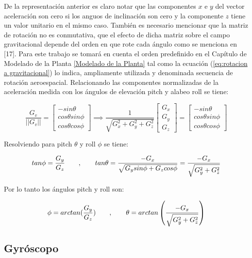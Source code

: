 \documentclass[../main.tex]{subfiles}
\begin{document}
De la representación anterior es claro notar que las componentes $x$
e $y$ del vector aceleración son cero si los anguos de inclinación
son cero y la componente $z$ tiene un valor unitario en el mismo
caso. También es necesario mencionar que la matriz de rotación no
es conmutativa, que el efecto de dicha matriz sobre el campo gravitacional
depende del orden en que rote cada ángulo como se menciona en [17].
Para este trabajo se tomará en cuenta el orden predefinido en el
Capítulo de Modelado de la Planta \ref{Modelado de la Planta} tal como la ecuación (\ref{eq:rotacion a gravitacional})
lo indica, ampliamente utilizada y denominada secuencia de rotación
aeroespacial. Relacionando las componentes normalizadas de la aceleración
medida con los ángulos de elevación pitch y alabeo roll se tiene:

\begin{equation}
\frac{G_{v}}{||G_{v}||}=\left[\begin{array}{c}
-sin\theta\\
cos\theta sin\phi\\
cos\theta cos\phi
\end{array}\right]\implies\frac{1}{\sqrt{G_{x}^{2}+G_{y}^{2}+G_{z}^{2}}}\left[\begin{array}{c}
G_{x}\\
G_{y}\\
G_{z}
\end{array}\right]=\left[\begin{array}{c}
-sin\theta\\
cos\theta sin\phi\\
cos\theta cos\phi
\end{array}\right]
\end{equation}

Resolviendo para pitch $\theta$ y roll $\phi$ se tiene:

\begin{equation}
tan\phi=\frac{G_{y}}{G_{z}}\quad\quad,\quad\quad\hfill tan\theta=\frac{-G_{x}}{\sqrt{G_{y}sin\phi+G_{z}cos\phi}}=\frac{-G_{x}}{\sqrt{G_{y}^{2}+G_{z}^{2}}}
\end{equation}

Por lo tanto los ángulos pitch y roll son:

\begin{equation}
\phi=arctan(\frac{G_{y}}{G_{z}})\quad\quad,\quad\quad\hfill \theta=arctan\left(\frac{-G_{x}}{\sqrt{G_{y}^{2}+G_{z}^{2}}}\right)
\end{equation}

\subsection{Gyróscopo}
\end{document}
